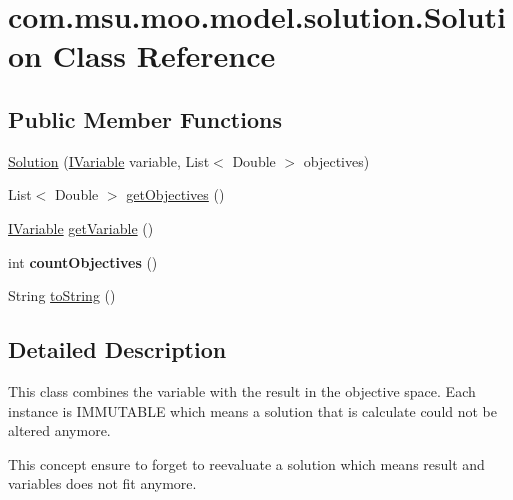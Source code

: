 \hypertarget{classcom_1_1msu_1_1moo_1_1model_1_1solution_1_1Solution}{\section{com.\-msu.\-moo.\-model.\-solution.\-Solution Class Reference}
\label{classcom_1_1msu_1_1moo_1_1model_1_1solution_1_1Solution}
}
\subsection*{Public Member Functions}
\begin{DoxyCompactItemize}
\item 
\hyperlink{classcom_1_1msu_1_1moo_1_1model_1_1solution_1_1Solution_a759abac5dda1b043f5b0e6eda2326fc9}{Solution} (\hyperlink{interfacecom_1_1msu_1_1moo_1_1model_1_1interfaces_1_1IVariable}{I\-Variable} variable, List$<$ Double $>$ objectives)
\item 
List$<$ Double $>$ \hyperlink{classcom_1_1msu_1_1moo_1_1model_1_1solution_1_1Solution_a82ad1dc142a62508d5c18dd17d3eaf1c}{get\-Objectives} ()
\item 
\hyperlink{interfacecom_1_1msu_1_1moo_1_1model_1_1interfaces_1_1IVariable}{I\-Variable} \hyperlink{classcom_1_1msu_1_1moo_1_1model_1_1solution_1_1Solution_ad5bb8160a7db2be6a161683362a13e33}{get\-Variable} ()
\item 
\hypertarget{classcom_1_1msu_1_1moo_1_1model_1_1solution_1_1Solution_a72a3ed4642fd006574ed1790464cfc53}{int {\bfseries count\-Objectives} ()}\label{classcom_1_1msu_1_1moo_1_1model_1_1solution_1_1Solution_a72a3ed4642fd006574ed1790464cfc53}

\item 
String \hyperlink{classcom_1_1msu_1_1moo_1_1model_1_1solution_1_1Solution_a4e9941d11c66d5bf0288c867540b1b19}{to\-String} ()
\end{DoxyCompactItemize}


\subsection{Detailed Description}
This class combines the variable with the result in the objective space. Each instance is I\-M\-M\-U\-T\-A\-B\-L\-E which means a solution that is calculate could not be altered anymore.

This concept ensure to forget to reevaluate a solution which means result and variables does not fit anymore. 

